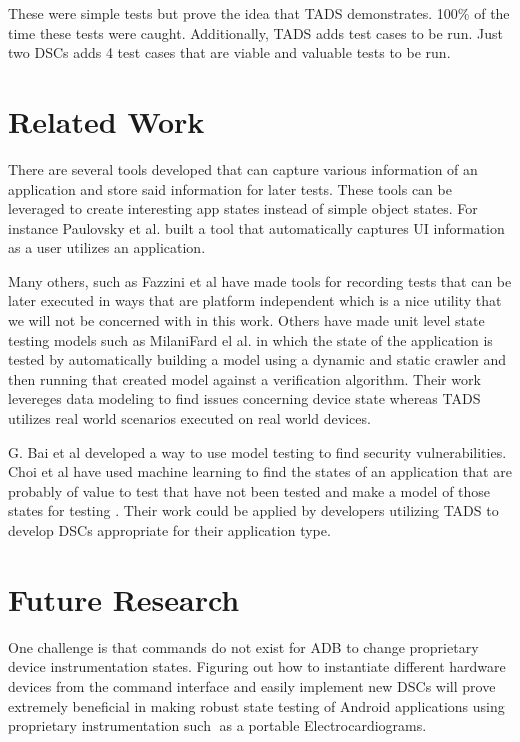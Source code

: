 These were simple tests but prove the idea that TADS demonstrates.  100\% of the time these tests were caught.  Additionally, TADS adds test cases to be run.  Just two DSCs adds 4 test cases that are viable and valuable tests to be run.

\section{Related Work}
There are several tools developed that can capture various information of an application and store said information for later tests.  These tools can be leveraged to create interesting app states instead of simple object states.  For instance Paulovsky et al. \cite{7962332} built a tool that automatically captures UI information as a user utilizes an application. 

Many others, such as Fazzini et al \cite{7927971} have made tools for recording tests that can be later executed in ways that are platform independent which is a nice utility that we will not be concerned with in this work.  Others have made unit level state testing models such as MilaniFard el al. \cite{MilaniFard:2014:LET:2642937.2642991} in which the state of the application is tested by automatically building a model using a dynamic and static crawler and then running that created model against a verification algorithm.  Their work levereges data modeling to find issues concerning device state whereas TADS utilizes real world scenarios executed on real world devices.  

G. Bai et al \cite{7911333} developed a way to use model testing to find security vulnerabilities.  Choi et al have used machine learning to find the states of an application that are probably of value to test that have not been tested and make a model of those states for testing \cite{Choi:2013:GGT:2544173.2509552}.  Their work could be applied by developers utilizing TADS to develop DSCs appropriate for their application type. \\


\section{Future Research}
One challenge is that commands do not exist for ADB to change proprietary device instrumentation states.  Figuring out how to instantiate different hardware devices from the command interface and easily implement new DSCs will prove extremely beneficial in making robust state testing of Android applications using proprietary instrumentation such as a portable Electrocardiograms.  

